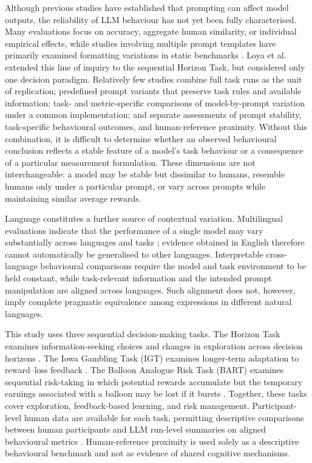 Although previous studies have established that prompting can affect model outputs, the reliability of LLM behaviour has not yet been fully characterised. Many evaluations focus on accuracy, aggregate human similarity, or individual empirical effects, while studies involving multiple prompt templates have primarily examined formatting variations in static benchmarks \cite{Sclar2024PromptFormatting}. Loya et al.~\cite{Loya2023PromptSensitivityDecision} extended this line of inquiry to the sequential Horizon Task, but considered only one decision paradigm. Relatively few studies combine full task runs as the unit of replication; predefined prompt variants that preserve task rules and available information; task- and metric-specific comparisons of model-by-prompt variation under a common implementation; and separate assessments of prompt stability, task-specific behavioural outcomes, and human-reference proximity. Without this combination, it is difficult to determine whether an observed behavioural conclusion reflects a stable feature of a model's task behaviour or a consequence of a particular measurement formulation. These dimensions are not interchangeable: a model may be stable but dissimilar to humans, resemble humans only under a particular prompt, or vary across prompts while maintaining similar average rewards.

Language constitutes a further source of contextual variation. Multilingual evaluations indicate that the performance of a single model may vary substantially across languages and tasks \cite{Ahuja2023MEGA}; evidence obtained in English therefore cannot automatically be generalised to other languages. Interpretable cross-language behavioural comparisons require the model and task environment to be held constant, while task-relevant information and the intended prompt manipulation are aligned across languages. Such alignment does not, however, imply complete pragmatic equivalence among expressions in different natural languages.

This study uses three sequential decision-making tasks. The Horizon Task examines information-seeking choices and changes in exploration across decision horizons \cite{Wilson2014}. The Iowa Gambling Task (IGT) examines longer-term adaptation to reward--loss feedback \cite{Bechara1994}. The Balloon Analogue Risk Task (BART) examines sequential risk-taking in which potential rewards accumulate but the temporary earnings associated with a balloon may be lost if it bursts \cite{Lejuez2002}. Together, these tasks cover exploration, feedback-based learning, and risk management. Participant-level human data are available for each task, permitting descriptive comparisons between human participants and LLM run-level summaries on aligned behavioural metrics \cite{Feng2021ExploreExploit,Steingroever2015IGTData,Sebri2023BART}. Human-reference proximity is used solely as a descriptive behavioural benchmark and not as evidence of shared cognitive mechanisms.

